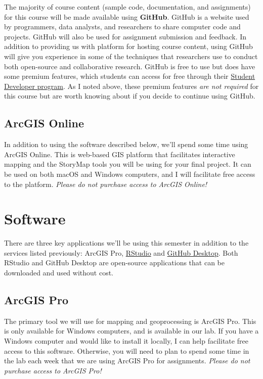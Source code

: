 \documentclass[
]{book}
\begin{document}
The majority of course content (sample code, documentation, and assignments) for this course will be made available using \textbf{GitHub}. GitHub is a website used by programmers, data analysts, and researchers to share computer code and projects. GitHub will also be used for assignment submission and feedback. In addition to providing us with platform for hosting course content, using GitHub will give you experience in some of the techniques that researchers use to conduct both open-source and collaborative research. GitHub is free to use but does have some premium features, which students can access for free through their \href{https://education.github.com/pack/}{Student Developer program}. As I noted above, these premium features \emph{are not required} for this course but are worth knowing about if you decide to continue using GitHub.

\hypertarget{arcgis-online}{%
\subsection{ArcGIS Online}\label{arcgis-online}}

In addition to using the software described below, we'll spend some time using ArcGIS Online. This is web-based GIS platform that facilitates interactive mapping and the StoryMap tools you will be using for your final project. It can be used on both macOS and Windows computers, and I will facilitate free access to the platform. \emph{Please do not purchase access to ArcGIS Online!}

\hypertarget{software}{%
\section{Software}\label{software}}

There are three key applications we'll be using this semester in addition to the services listed previously: ArcGIS Pro, \href{https://www.rstudio.com}{RStudio} and \href{https://desktop.github.com}{GitHub Desktop}. Both RStudio and GitHub Desktop are open-source applications that can be downloaded and used without cost.

\hypertarget{arcgis-pro}{%
\subsection{ArcGIS Pro}\label{arcgis-pro}}

The primary tool we will use for mapping and geoprocessing is ArcGIS Pro. This is only available for Windows computers, and is available in our lab. If you have a Windows computer and would like to install it locally, I can help facilitate free access to this software. Otherwise, you will need to plan to spend some time in the lab each week that we are using ArcGIS Pro for assignments. \emph{Please do not purchase access to ArcGIS Pro!}
\end{document}
